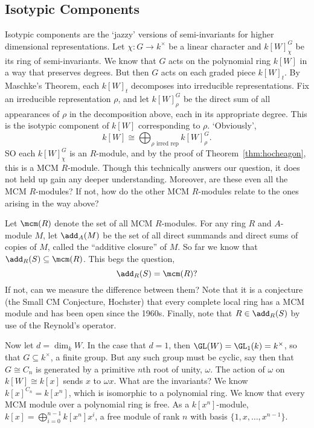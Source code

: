 \subsection{Isotypic Components}

Isotypic components are the `jazzy' versions of semi-invariants for higher dimensional representations. Let $\chi: G \to k^\times$ be a linear character and $k[W]^G_\chi$ be its ring of semi-invariants. We know that $G$ acts on the polynomial ring $k[W]$ in a way that preserves degrees. But then $G$ acts on each graded piece $k[W]_t$. By Maschke's Theorem, each $k[W]_t$ decomposes into irreducible representations. Fix an irreducible representation $\rho$, and let $k[W]_\rho^G$ be the direct sum of all appearances of $\rho$ in the decomposition above, each in its appropriate degree. This is the isotypic component of $k[W]$ corresponding to $\rho$. `Obviously', 
	\[
	k[W] \cong \bigoplus_{\rho \text{ irred rep}} k[W]_\rho^G. 
	\]
SO each $k[W]^G_\chi$ is an $R$-module, and by the proof of Theorem~\ref{thm:hocheagon}, this is a MCM $R$-module. Though this technically answers our question, it does not held up gain any deeper understanding. Moreover, are these even all the MCM $R$-modules? If not, how do the other MCM $R$-modules relate to the ones arising in the way above? 


Let $\mcm(R)$ denote the set of all MCM $R$-modules. For any ring $R$ and $A$-module $M$, let $\add_A(M)$ be the set of all direct summands and direct sums of copies of $M$, called the ``additive closure'' of $M$. So far we know that $\add_R(S) \subseteq \mcm(R)$. This begs the question, 
	\[
	\add_R(S) = \mcm(R)?
	\]
If not, can we measure the difference between them? Note that it is a conjecture (the Small CM Conjecture, Hochster) that every complete local ring has a MCM module and has been open since the 1960s. Finally, note that $R \in \add_R(S)$ by use of the Reynold's operator.  


Now let $d= \dim_k W$. In the case that $d=1$, then $\GL(W)= \GL_1(k)= k^\times$, so that $G \subseteq k^\times$, a finite group. But any such group must be cyclic, say then that $G \cong C_n$ is generated by a primitive $n$th root of unity, $\omega$. The action of $\omega$ on $k[W] \cong k[x]$ sends $x$ to $\omega x$. What are the invariants? We know $k[x]^{C_n}= k[x^n]$, which is isomorphic to a polynomial ring. We know that every MCM module over a polynomial ring is free. As a $k[x^n]$-module, $k[x]= \bigoplus_{i=0}^{n-1} k[x^n] x^i$, a free module of rank $n$ with basis $\{1,x,\ldots,x^{n-1}\}$. 


